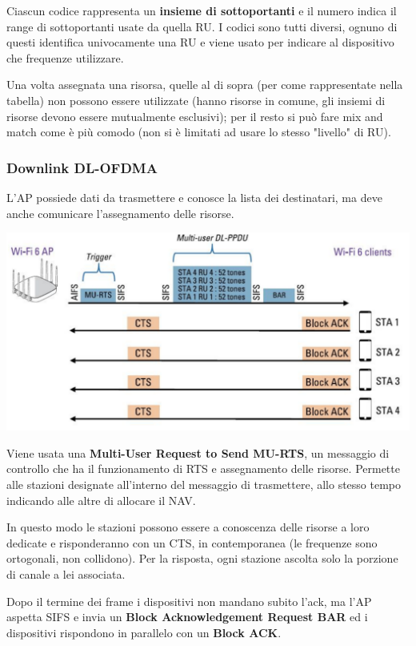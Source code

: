 Ciascun codice rappresenta un \textbf{insieme di sottoportanti} e il numero indica il range di sottoportanti usate da quella RU. I codici sono tutti diversi, ognuno di questi identifica univocamente una RU e viene usato per indicare al dispositivo che frequenze utilizzare.

Una volta assegnata una risorsa, quelle al di sopra (per come rappresentate nella tabella) non possono essere utilizzate (hanno risorse in comune, gli insiemi di risorse devono essere mutualmente esclusivi); per il resto si può fare mix and match come è più comodo (non si è limitati ad usare lo stesso "livello" di RU).

\subsubsection{Downlink DL-OFDMA}

L'AP possiede dati da trasmettere e conosce la lista dei destinatari, ma deve anche comunicare l'assegnamento delle risorse. 
\begin{center}
	\includegraphics[width=0.95\linewidth]{img/wlan/downlink}
\end{center}

Viene usata una \textbf{Multi-User Request to Send MU-RTS}, un messaggio di controllo che ha il funzionamento di RTS e assegnamento delle risorse. Permette alle stazioni designate all'interno del messaggio di trasmettere, allo stesso tempo indicando alle altre di allocare il NAV.

In questo modo le stazioni possono essere a conoscenza delle risorse a loro dedicate e risponderanno con un CTS, in contemporanea (le frequenze sono ortogonali, non collidono). Per la risposta, ogni stazione ascolta solo la porzione di canale a lei associata.

Dopo il termine dei frame i dispositivi non mandano subito l'ack, ma l'AP aspetta SIFS e invia un \textbf{Block Acknowledgement Request BAR} ed i dispositivi rispondono in parallelo con un \textbf{Block ACK}.


